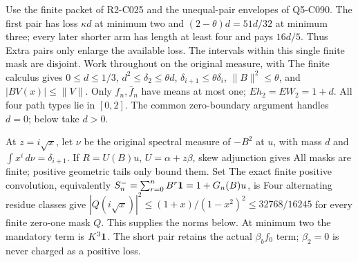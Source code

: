 Use the finite packet of R2-C025 and the unequal-pair envelopes of Q5-C090. The first pair has loss \(\kappa d\) at minimum two and \((2-\theta)d=51d/32\) at minimum three; every later shorter arm has length at least four and pays \(16d/5\). Thus
Extra pairs only enlarge the available loss. The intervals within this single finite mask are disjoint. Work throughout on the original measure, with
The finite calculus gives \(0\le d\le1/3\), \(d^2\le\delta_2\le\theta d\), \(\delta_{i+1}\le\theta\delta_i\), \(\|B\|^2\le\theta\), and \(|BV(x)|\le\|V\|\). Only \(f_n,\allowbreak \bar f_n\) have means at most one; \(Eh_2=EW_2=1+d\). All four path types lie in \([0,\allowbreak 2]\). The common zero-boundary argument handles \(d=0\); below take \(d>0\).

At \(z=i\sqrt x\), let \(\nu\) be the original spectral measure of \(-B^2\) at \(u\), with mass \(d\) and \(\int x^i\,\allowbreak d\nu=\delta_{i+1}\). If \(R=U(B)u\), \(U=\alpha+z\beta\), skew adjunction gives
All masks are finite; positive geometric tails only bound them. Set
The exact finite positive convolution, equivalently \(S_n^-=\sum_{r=0}^nB^r\mathbf1=1+G_n(B)u\), is
Four alternating residue classes give \(|Q(i\sqrt x)|^2\le(1+x)/(1-x^2)^2\le32768/16245\) for every finite zero-one mask \(Q\). This supplies the norms below. At minimum two the mandatory term is \(K^3\mathbf1\). The short pair retains the actual \(\beta_bf_0\) term; \(\beta_2=0\) is never charged as a positive loss.

